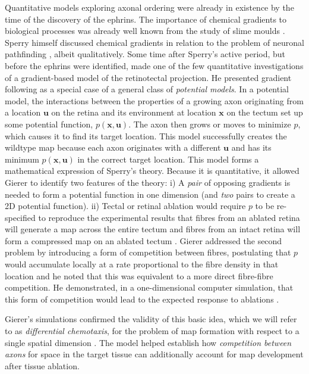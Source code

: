 \documentclass[9pt,lineno]{elife}
\begin{document}
Quantitative models exploring axonal ordering were already in existence by the time of the discovery of the ephrins. 
The importance of chemical gradients to biological processes was already well known from the study of slime moulds \citep{bonner_evidence_1947}. 
Sperry himself discussed chemical gradients in relation to the problem of neuronal pathfinding \citep{sperry_problems_1955}, albeit qualitatively.  
Some time after Sperry's active period, but before the ephrins were identified, \citet{gierer_development_1981,gierer_model_1983,gierer_directional_1987} made one of the few quantitative investigations of a gradient-based model of the retinotectal projection. He presented gradient following as a special case of a general class of \emph{potential models}. 
In a potential model, the interactions between the properties of a growing axon originating from a location $\mathbf{u}$ on the retina and its environment at location $\mathbf{x}$ on the tectum set up some potential function, $p(\mathbf{x},\mathbf{u})$. 
The axon then grows or moves to minimize $p$, which causes it to find its target location. This model successfully creates the wildtype map because each axon originates with a different $\mathbf{u}$ and has its minimum $p(\mathbf{x},\mathbf{u})$ in the correct target location.
This model forms a mathematical expression of Sperry's theory. Because it is quantitative, it allowed Gierer to identify two features of the theory: i) A \emph{pair} of opposing gradients is needed to form a potential function in one dimension (and \emph{two} pairs to create a 2D potential function). ii) Tectal or retinal ablation would require $p$ to be re-specified to reproduce the experimental results that fibres from an ablated retina will generate a map across the entire tectum and fibres from an intact retina will form a compressed map on an ablated tectum \citep{attardi_preferential_1963,schmidt_retinal_1978,schmidt_expansion_1978}.
Gierer addressed the second problem by introducing a form of competition between fibres, postulating that $p$ would accumulate locally at a rate proportional to the fibre density in that location and he noted that this was equivalent to a more direct fibre-fibre competition.
He demonstrated, in a one-dimensional computer simulation, that this form of competition would lead to the expected response to ablations \citep{gierer_model_1983}.

Gierer's simulations confirmed the validity of this basic idea, which we will refer to as \emph{differential chemotaxis}, for the problem of map formation with respect to a single spatial dimension \citep{gierer_model_1983,karbowski_model_2004}. 
The model helped establish how \emph{competition between axons} for space in the target tissue can additionally account for  map development after tissue ablation.
\end{document}

